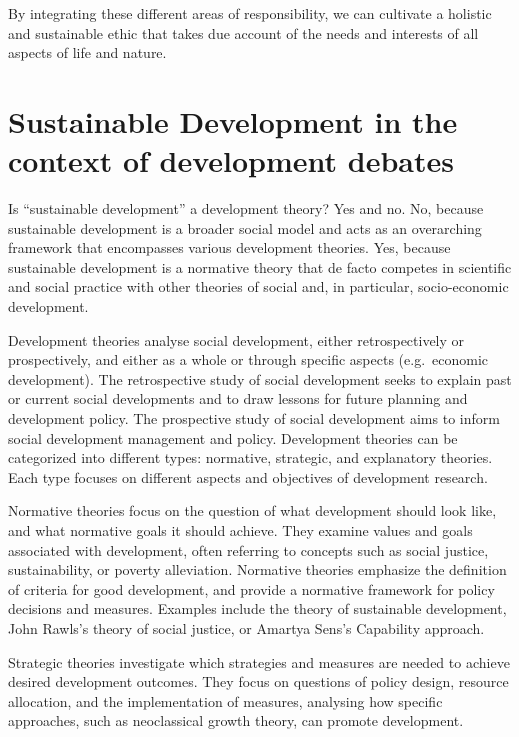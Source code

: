 \documentclass[
  a4paper,
  openany]{book}
\begin{document}
By integrating these different areas of responsibility, we can cultivate
a holistic and sustainable ethic that takes due account of the needs and
interests of all aspects of life and nature.

\section{Sustainable Development in the context of development
debates}\label{sustainable-development-in-the-context-of-development-debates}

Is ``sustainable development'' a development theory? Yes and no. No,
because sustainable development is a broader social model and acts as an
overarching framework that encompasses various development theories.
Yes, because sustainable development is a normative theory that de facto
competes in scientific and social practice with other theories of social
and, in particular, socio-economic development.

Development theories analyse social development, either retrospectively
or prospectively, and either as a whole or through specific aspects
(e.g.~economic development). The retrospective study of social
development seeks to explain past or current social developments and to
draw lessons for future planning and development policy. The prospective
study of social development aims to inform social development management
and policy. Development theories can be categorized into different
types: normative, strategic, and explanatory theories. Each type focuses
on different aspects and objectives of development research.

Normative theories focus on the question of what development should look
like, and what normative goals it should achieve. They examine values
and goals associated with development, often referring to concepts such
as social justice, sustainability, or poverty alleviation. Normative
theories emphasize the definition of criteria for good development, and
provide a normative framework for policy decisions and measures.
Examples include the theory of sustainable development, John Rawls's
theory of social justice, or Amartya Sens's Capability approach.

Strategic theories investigate which strategies and measures are needed
to achieve desired development outcomes. They focus on questions of
policy design, resource allocation, and the implementation of measures,
analysing how specific approaches, such as neoclassical growth theory,
can promote development.
\end{document}
